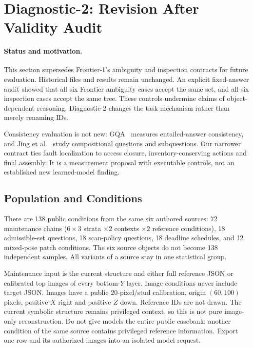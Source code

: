 \clearpage
\twocolumn
\section{Diagnostic-2: Revision After Validity Audit}
\label{sec:diagnostic2}
\paragraph{Status and motivation.}
This section supersedes Frontier-1's ambiguity and inspection contracts
for future evaluation. Historical files and results remain unchanged.
An explicit fixed-answer audit showed that all six Frontier ambiguity
cases accept the same set, and all six inspection cases accept the
same tree. These controls undermine claims of object-dependent reasoning.
Diagnostic-2 changes the task mechanism rather than merely renaming IDs.

Consistency evaluation is not new: GQA~\cite{hudson2019gqa} measures
entailed-answer consistency, and Jing et al.~\cite{jing2022consistency}
study compositional questions and subquestions. Our narrower contract
ties fault localization to access closure, inventory-conserving actions
and final assembly. It is a measurement proposal with executable
controls, not an established new learned-model finding.

\subsection{Population and Conditions}
There are 138 public conditions from the same six authored sources:
72 maintenance chains ($6\times3$ strata $\times2$ contexts $\times2$
reference conditions), 18 admissible-set questions, 18 scan-policy
questions, 18 deadline schedules, and 12 mixed-pose patch conditions.
The six source objects do not become 138 independent samples.
All variants of a source stay in one statistical group.

Maintenance input is the current structure and either full reference
JSON or calibrated top images of every bottom-$Y$ layer. Image conditions
never include target JSON. Images have a public 20-pixel/stud calibration,
origin $(60,100)$ pixels, positive $X$ right and positive $Z$ down.
Reference IDs are not drawn. The current symbolic structure remains
privileged context, so this is not pure image-only reconstruction.
Do not give models the entire public casebank: another condition of
the same source contains privileged reference information. Export one
row and its authorized images into an isolated model request.

